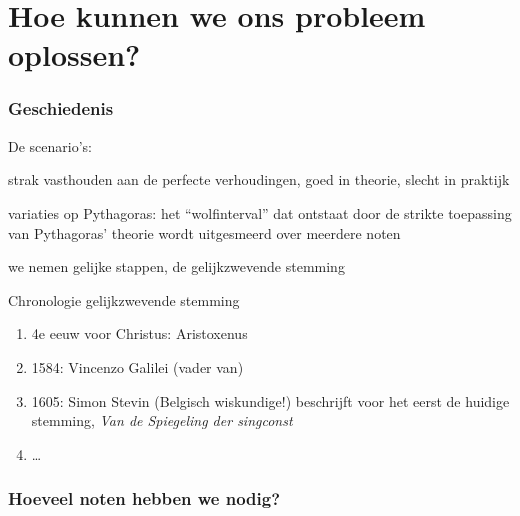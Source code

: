 \documentclass[compress, darktitle, framenumber, handout, totalframenumber]{beamer}
\begin{document}
\section{Hoe kunnen we ons probleem oplossen?}
\begin{frame}
  \frametitle{Geschiedenis}

  De scenario's:
  \begin{description}[middeleeuwen]
    \item[Pythagoras] strak vasthouden aan de perfecte verhoudingen, goed in theorie, slecht in praktijk
    \item[middeleeuwen] variaties op Pythagoras: het ``wolfinterval'' dat ontstaat door de strikte toepassing van Pythagoras' theorie wordt uitgesmeerd over meerdere noten
    \item[hedendaags] we nemen gelijke stappen, de \alert{gelijkzwevende stemming}
  \end{description}
  \pause
  \begin{block}{Chronologie gelijkzwevende stemming}
    \begin{enumerate}
      \item 4e eeuw voor Christus: Aristoxenus
      \item 1584: Vincenzo Galilei (vader van)
      \item 1605: Simon Stevin (Belgisch wiskundige!) beschrijft voor het eerst de huidige stemming, \emph{Van de Spiegeling der singconst}
      \item \ldots
    \end{enumerate}
  \end{block}
\end{frame}

\begin{frame}
  \frametitle{Hoeveel noten hebben we nodig?}

  \begin{center}
  \end{center}
\end{frame}
\end{document}
